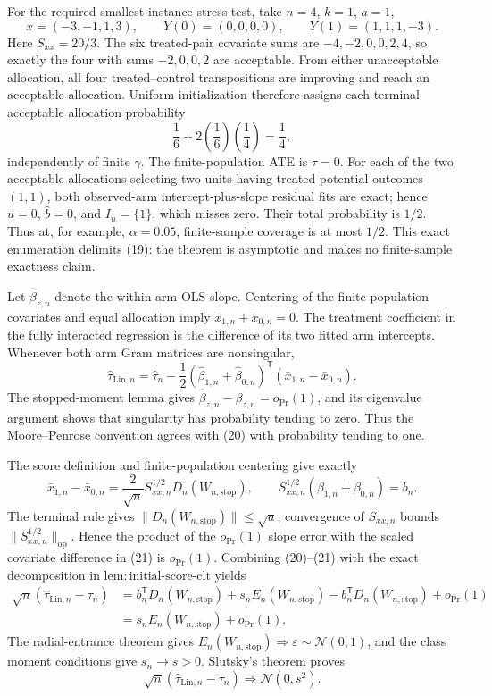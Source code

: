 For the required smallest-instance stress test, take \(n=4\), \(k=1\), \(a=1\),
\[
 x=(-3,-1,1,3),\qquad Y(0)=(0,0,0,0),\qquad
 Y(1)=(1,1,1,-3).
\]
Here \(S_{xx}=20/3\).  The six treated-pair covariate sums are \(-4,-2,0,0,2,4\), so exactly the four with sums \(-2,0,0,2\) are acceptable.  From either unacceptable allocation, all four treated--control transpositions are improving and reach an acceptable allocation.  Uniform initialization therefore assigns each terminal acceptable allocation probability
\[
 \frac16+2\left(\frac16\right)\left(\frac14\right)=\frac14,
\]
independently of finite \(\gamma\).  The finite-population ATE is \(\tau=0\).  For each of the two acceptable allocations selecting two units having treated potential outcomes \((1,1)\), both observed-arm intercept-plus-slope residual fits are exact; hence \(\widehat u=0\), \(\widehat b=0\), and \(I_n=\{1\}\), which misses zero.  Their total probability is \(1/2\).  Thus at, for example, \(\alpha=0.05\), finite-sample coverage is at most \(1/2\).  This exact enumeration delimits (19): the theorem is asymptotic and makes no finite-sample exactness claim.

Let \(\widehat\beta_{z,n}\) denote the within-arm OLS slope.  Centering of the finite-population covariates and equal allocation imply \(\bar x_{1,n}+\bar x_{0,n}=0\).  The treatment coefficient in the fully interacted regression is the difference of its two fitted arm intercepts.  Whenever both arm Gram matrices are nonsingular,
\[
 \widehat\tau_{\mathrm{Lin},n}
 =\widehat\tau_n-\frac12(\widehat\beta_{1,n}+\widehat\beta_{0,n})^{\mathsf T}
 (\bar x_{1,n}-\bar x_{0,n}). \tag{20}
\]
The stopped-moment lemma gives \(\widehat\beta_{z,n}-\beta_{z,n}=o_{\Pr}(1)\), and its eigenvalue argument shows that singularity has probability tending to zero.  Thus the Moore--Penrose convention agrees with (20) with probability tending to one.

The score definition and finite-population centering give exactly
\[
 \bar x_{1,n}-\bar x_{0,n}
 =\frac2{\sqrt n}S_{xx,n}^{1/2}D_n(W_{n,\mathrm{stop}}),
 \qquad
 S_{xx,n}^{1/2}(\beta_{1,n}+\beta_{0,n})=b_n. \tag{21}
\]
The terminal rule gives \(\|D_n(W_{n,\mathrm{stop}})\|\le\sqrt a\); convergence of \(S_{xx,n}\) bounds \(\|S_{xx,n}^{1/2}\|_{\mathrm{op}}\).  Hence the product of the \(o_{\Pr}(1)\) slope error with the scaled covariate difference in (21) is \(o_{\Pr}(1)\).  Combining (20)--(21) with the exact decomposition in \(\mathrm{lem{:}initial\mbox{-}score\mbox{-}clt}\) yields
\[
 \begin{aligned}
 \sqrt n(\widehat\tau_{\mathrm{Lin},n}-\tau_n)
 &=b_n^{\mathsf T}D_n(W_{n,\mathrm{stop}})
   +s_nE_n(W_{n,\mathrm{stop}})
   -b_n^{\mathsf T}D_n(W_{n,\mathrm{stop}})+o_{\Pr}(1)\\
 &=s_nE_n(W_{n,\mathrm{stop}})+o_{\Pr}(1). \tag{22}
 \end{aligned}
\]
The radial-entrance theorem gives \(E_n(W_{n,\mathrm{stop}})\Rightarrow\varepsilon\sim\mathcal N(0,1)\), and the class moment conditions give \(s_n\to s>0\).  Slutsky's theorem proves
\[
 \sqrt n(\widehat\tau_{\mathrm{Lin},n}-\tau_n)
 \Rightarrow\mathcal N(0,s^2). \tag{23}
\]

